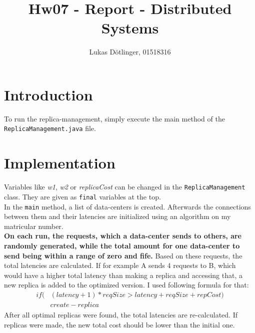 \documentclass{article}
\begin{document}
  \title{Hw07 - Report - Distributed Systems}
  \date{}
  \author{Lukas Dötlinger, 01518316}
	
  \maketitle
  
  \section*{Introduction}
  
  	To run the replica-management, simply execute the main method of the\\ \texttt{ReplicaManagement.java} file.\\
  	
  \section*{Implementation}
  
    Variables like \textit{w1}, \textit{w2} or \textit{replicaCost} can be changed in the \texttt{ReplicaManagement} class. They are given as \texttt{final} variables at the top.\\
    In the \texttt{main} method, a list of data-centers is created. Afterwards the connections between them and their latencies are initialized using an algorithm on my matricular number.\\
    \textbf{On each run, the requests, which a data-center sends to others, are randomly generated, while the total amount for one data-center to send being within a range of zero and fife.} Based on these requests, the total latencies are calculated. If for example A sends 4 requests to B, which would have a higher total latency than making a replica and accessing that, a new replica is added to the optimized version. I used following formula for that:
    \begin{equation}
      \begin{split}
        if ( & (latency+1) * reqSize > latency + reqSize + repCost) \\
        & create-replica
      \end{split}
    \end{equation}
    After all optimal replicas were found, the total latencies are re-calculated. If replicas were made, the new total cost should be lower than the initial one.
  
\end{document}
